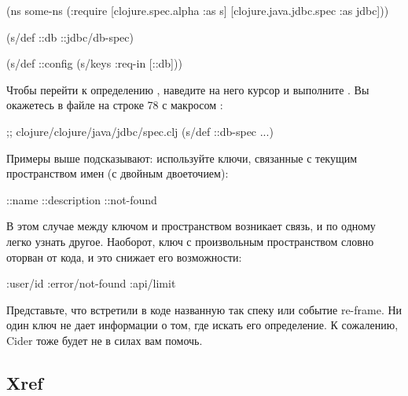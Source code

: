 \begin{english}
  \begin{clojure}
(ns some-ns
  (:require
   [clojure.spec.alpha :as s]
   [clojure.java.jdbc.spec :as jdbc]))

(s/def ::db ::jdbc/db-spec)

(s/def ::config
  (s/keys :req-in [::db]))
  \end{clojure}
\end{english}

Чтобы перейти к определению , наведите на него курсор и выполните . Вы окажетесь в файле  на строке 78 с макросом :

\begin{english}
  \begin{clojure}
;; clojure/clojure/java/jdbc/spec.clj
(s/def ::db-spec ...)
  \end{clojure}
\end{english}

Примеры выше подсказывают: используйте ключи, связанные с текущим пространством имен (с двойным двоеточием):

\begin{english}
  \begin{clojure}
::name
::description
::not-found
  \end{clojure}
\end{english}

В этом случае между ключом и пространством возникает связь, и по одному легко узнать другое. Наоборот, ключ с произвольным пространством словно оторван от кода, и это снижает его возможности:

\begin{english}
  \begin{clojure}
:user/id
:error/not-found
:api/limit
  \end{clojure}
\end{english}

Представьте, что встретили в коде названную так спеку или событие re-frame. Ни один ключ не дает информации о том, где искать его определение. К сожалению, Cider тоже будет не в силах вам помочь.

\subsection{Xref}

\def\urlfastautocomp{https://pypi.org/project/fast-autocomplete/}

